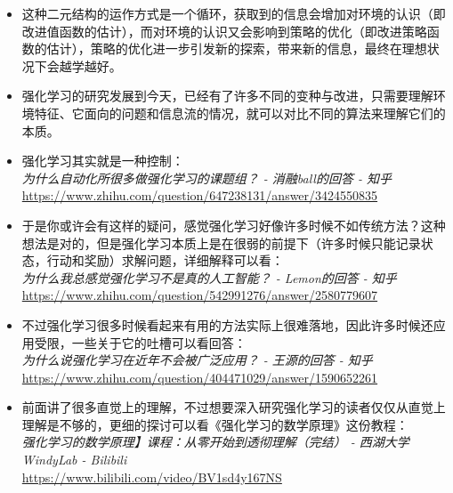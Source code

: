 \begin{itemize}
    \item 这种二元结构的运作方式是一个循环，获取到的信息会增加对环境的认识（即改进值函数的估计），而对环境的认识又会影响到策略的优化（即改进策略函数的估计），策略的优化进一步引发新的探索，带来新的信息，最终在理想状况下会越学越好。
    \item 强化学习的研究发展到今天，已经有了许多不同的变种与改进，只需要理解环境特征、它面向的问题和信息流的情况，就可以对比不同的算法来理解它们的本质。
\end{itemize}

\begin{tcolorbox}[myrecommendbox, title=推荐阅读, breakable=false]
    \begin{itemize}
        \item 强化学习其实就是一种控制：\\
              \textit{为什么自动化所很多做强化学习的课题组？ - 消融ball的回答 - 知乎}\\
              \url{https://www.zhihu.com/question/647238131/answer/3424550835}
        \item 于是你或许会有这样的疑问，感觉强化学习好像许多时候不如传统方法？这种想法是对的，但是强化学习本质上是在很弱的前提下（许多时候只能记录状态，行动和奖励）求解问题，详细解释可以看：\\
              \textit{为什么我总感觉强化学习不是真的人工智能？ - Lemon的回答 - 知乎}\\
              \url{https://www.zhihu.com/question/542991276/answer/2580779607}
        \item 不过强化学习很多时候看起来有用的方法实际上很难落地，因此许多时候还应用受限，一些关于它的吐槽可以看回答：\\
              \textit{为什么说强化学习在近年不会被广泛应用？ - 王源的回答 - 知乎}\\
              \url{https://www.zhihu.com/question/404471029/answer/1590652261}
        \item 前面讲了很多直觉上的理解，不过想要深入研究强化学习的读者仅仅从直觉上理解是不够的，更细的探讨可以看《强化学习的数学原理》这份教程：\\
              \textit{强化学习的数学原理】课程：从零开始到透彻理解（完结） - 西湖大学WindyLab - Bilibili}\\
              \url{https://www.bilibili.com/video/BV1sd4y167NS}
    \end{itemize}
\end{tcolorbox}

\newpage